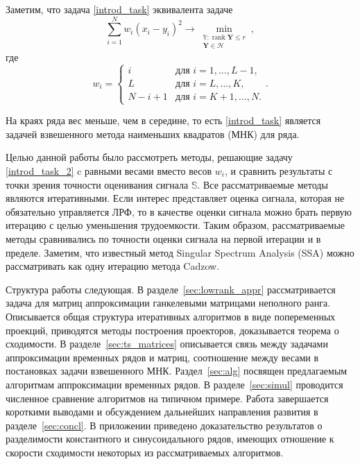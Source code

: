 \documentclass[12pt,a4paper,fleqn,leqno]{article}
\def\rank{\mathop{\mathrm{rank}}}
\newcommand{\tsS}{\mathbb{S}}
\newcommand{\tsY}{\mathbb{Y}}
\newcommand{\bfY}{\mathbf{Y}}
\newcommand{\calH}{\mathcal{H}}
\begin{document}
Заметим, что задача \eqref{introd_task} эквивалента задаче
\begin{equation}\label{introd_task_2}
\sum_{i = 1}^N w_i(x_i - y_i)^2 \to \min_{\substack{\tsY: \rank \bfY \le r \\ \bfY \in \calH}},
\end{equation}
где
\begin{equation}
\label{eq:w}
w_i = \begin{cases}
i & \text{для $i = 1, \ldots, L-1,$}\\
L & \text{для $i = L, \ldots, K,$}\\
N - i + 1 & \text{для $i = K + 1, \ldots, N.$}
\end{cases}.
\end{equation}

На краях ряда вес меньше, чем в середине, то есть \eqref{introd_task} является задачей взвешенного метода наименьших квадратов (МНК) для ряда.

Целью данной работы было рассмотреть методы, решающие задачу \eqref{introd_task_2} c равными весами вместо весов $w_i$, и сравнить результаты с точки зрения точности оценивания сигнала $\tsS$. Все рассматриваемые методы являются итеративными. Если интерес представляет оценка сигнала, которая не обязательно управляется ЛРФ, то в качестве оценки сигнала можно брать первую итерацию с целью уменьшения трудоемкости. Таким образом, рассматриваемые методы сравнивались по точности оценки сигнала на первой итерации и в пределе. Заметим, что известный метод Singular Spectrum Analysis (SSA) \cite{Broomhead.King1986, Vautard.etal1992, Elsner.Tsonis1996, Golyandina.etal2001, Ghil.etal2002, Golyandina.Zhigljavsky2012} можно
рассматривать как одну итерацию метода Cadzow.

Структура работы следующая.  В разделе~\ref{sec:lowrank_appr} рассматривается задача для матриц аппроксимации ганкелевыми матрицами неполного ранга.
Описывается общая структура итеративных алгоритмов в виде попеременных проекций, приводятся методы построения проекторов, доказывается теорема о сходимости.
В разделе~\ref{sec:ts_matrices} описывается связь между задачами аппроксимации временных рядов и матриц, соотношение между весами в постановках задачи
взвешенного МНК. Раздел~\ref{sec:alg} посвящен предлагаемым алгоритмам аппроксимации временных рядов. В разделе~\ref{sec:simul} проводится численное сравнение алгоритмов на типичном примере.
Работа завершается короткими выводами и обсуждением дальнейших направления развития в разделе~\ref{sec:concl}. В приложении приведено доказательство результатов
о разделимости константного и синусоидального рядов, имеющих отношение к скорости сходимости некоторых из рассматриваемых алгоритмов.
\end{document}
